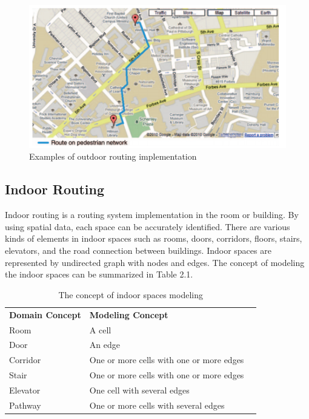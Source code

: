 \begin{figure}[h!]
	\centering
	\includegraphics[scale=0.7]{figure4a.png}
	\caption{Examples of outdoor routing implementation}
	\label{fig:figure4}
\end{figure}

\subsection{Indoor Routing}
Indoor routing is a routing system implementation in the room or building. By using spatial data, each space can be accurately identified. There are various kinds of elements in indoor spaces such as rooms, doors, corridors, floors, stairs, elevators, and the road connection between buildings. Indoor spaces are represented by undirected graph with nodes and edges. The concept of modeling the indoor spaces can be summarized in Table 2.1.

\begin{table}[h!]
	\centering
	\caption{The concept of indoor spaces modeling} %
	\label{indoor-concept-table}
	\begin{tabular}{|l|l|l}
		\cline{1-2}
		\textbf{Domain Concept} & \textbf{Modeling Concept}   &  \\ \cline{1-2}
		Room		&	A cell &  \\ \cline{1-2}
		Door		&	An edge  &  \\ \cline{1-2}
		Corridor	&	One or more cells with one or more edges &  \\ \cline{1-2}
		Stair		&	One or more cells with one or more edges &  \\ \cline{1-2}
		Elevator	&	One cell with several edges &  \\ \cline{1-2}
		Pathway		&	One or more cells with several edges &  \\ \cline{1-2}
	\end{tabular}
\end{table}

